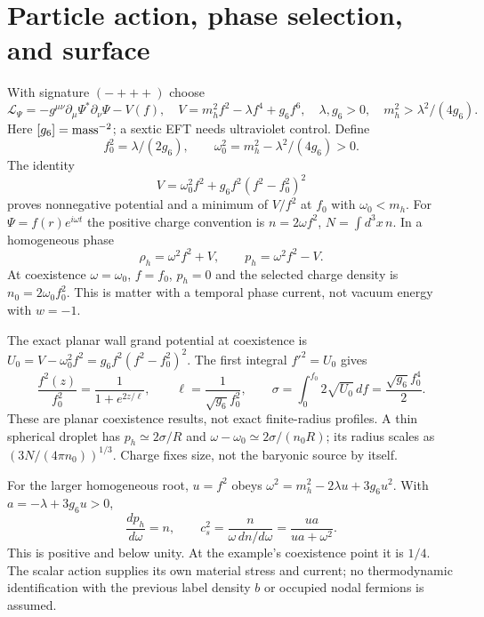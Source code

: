 \documentclass[11pt]{article}
\begin{document}
\section{Particle action, phase selection, and surface}
With signature $(-+++)$ choose
\begin{equation}
 \mathcal L_\Psi=-g^{\mu\nu}\partial_\mu\Psi^*\partial_\nu\Psi-V(f),
 \quad V=m_h^2 f^2-\lambda f^4+g_6 f^6,
 \quad \lambda,g_6>0,\quad m_h^2>\lambda^2/(4g_6).
 \label{pi:action}
\end{equation}
Here $[g_6]={\rm mass}^{-2}$; a sextic EFT needs ultraviolet control.
Define
\begin{equation}
 f_0^2=\lambda/(2g_6),\qquad
 \omega_0^2=m_h^2-\lambda^2/(4g_6)>0.
\end{equation}
The identity
\begin{equation}
 V=\omega_0^2 f^2+g_6 f^2(f^2-f_0^2)^2
\end{equation}
proves nonnegative potential and a minimum of $V/f^2$ at $f_0$ with
$\omega_0<m_h$. For $\Psi=f(r)e^{i\omega t}$ the positive charge convention
is $n=2\omega f^2$, $N=\int d^3x\,n$. In a homogeneous phase
\begin{equation}
 \rho_h=\omega^2 f^2+V,\qquad p_h=\omega^2f^2-V.
\end{equation}
At coexistence $\omega=\omega_0$, $f=f_0$, $p_h=0$ and the selected
charge density is $n_0=2\omega_0 f_0^2$. This is matter with a temporal
phase current, not vacuum energy with $w=-1$.

The exact planar wall grand potential at coexistence is
$U_0=V-\omega_0^2f^2=g_6 f^2(f^2-f_0^2)^2$.
The first integral $f'^2=U_0$ gives
\begin{equation}
 \frac{f^2(z)}{f_0^2}=\frac{1}{1+e^{2z/\ell}},\qquad
 \ell=\frac{1}{\sqrt{g_6}f_0^2},\qquad
 \sigma=\int_0^{f_0}2\sqrt{U_0}\,df
       =\frac{\sqrt{g_6}f_0^4}{2}.
 \label{pi:wall}
\end{equation}
These are planar coexistence results, not exact finite-radius profiles.
A thin spherical droplet has $p_h\simeq2\sigma/R$ and
$\omega-\omega_0\simeq2\sigma/(n_0R)$; its radius scales as
$(3N/(4\pi n_0))^{1/3}$. Charge fixes size, not the baryonic source by itself.

For the larger homogeneous root, $u=f^2$ obeys
$\omega^2=m_h^2-2\lambda u+3g_6u^2$. With $a=-\lambda+3g_6u>0$,
\begin{equation}
 \frac{dp_h}{d\omega}=n,\qquad
 c_s^2=\frac{n}{\omega\,dn/d\omega}
       =\frac{ua}{ua+\omega^2}.
\end{equation}
This is positive and below unity. At the example's coexistence point
it is $1/4$. The scalar action supplies its own material stress and
current; no thermodynamic identification with the previous label density
$b$ or occupied nodal fermions is assumed.
\end{document}

